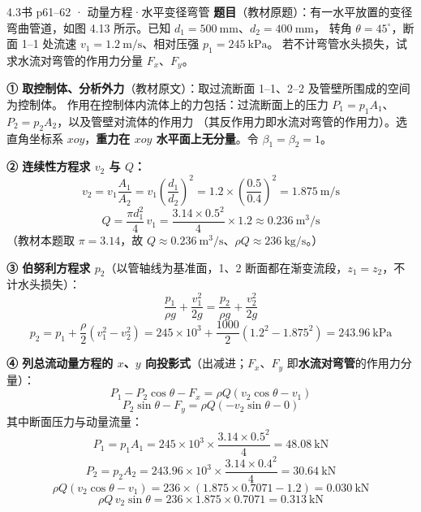 \begin{liti}{4.3}{书 p61--62 · 动量方程·水平变径弯管}
\textbf{题目}（教材原题）：有一水平放置的变径弯曲管道，如图 4.13 所示。已知 $d_1=500\ \mathrm{mm}$、$d_2=400\ \mathrm{mm}$，
转角 $\theta=45^{\circ}$，断面 1--1 处流速 $v_1=1.2\ \mathrm{m/s}$、相对压强 $p_1=245\ \mathrm{kPa}$。
若不计弯管水头损失，试求水流对弯管的作用力分量 $F_x$、$F_y$。


\begin{jie}
\textbf{① 取控制体、分析外力}（教材原文）：取过流断面 1--1、2--2 及管壁所围成的空间为控制体。
作用在控制体内流体上的力包括：过流断面上的压力 $P_1=p_1A_1$、$P_2=p_2A_2$，以及管壁对流体的作用力
（其反作用力即水流对弯管的作用力）。选直角坐标系 $xoy$，\textbf{重力在 $xoy$ 水平面上无分量}。令 $\beta_1=\beta_2=1$。

\textbf{② 连续性方程求 $v_2$ 与 $Q$：}
\[ v_2=v_1\frac{A_1}{A_2}=v_1\left(\frac{d_1}{d_2}\right)^2=1.2\times\left(\frac{0.5}{0.4}\right)^2=1.875\ \mathrm{m/s} \]
\[ Q=\frac{\pi d_1^2}{4}\,v_1=\frac{3.14\times0.5^2}{4}\times1.2\approx0.236\ \mathrm{m^3/s} \]
（教材本题取 $\pi=3.14$，故 $Q\approx0.236\ \mathrm{m^3/s}$、$\rho Q\approx236\ \mathrm{kg/s}$。）

\textbf{③ 伯努利方程求 $p_2$}（以管轴线为基准面，1、2 断面都在渐变流段，$z_1=z_2$，不计水头损失）：
\[ \frac{p_1}{\rho g}+\frac{v_1^2}{2g}=\frac{p_2}{\rho g}+\frac{v_2^2}{2g} \]
\[ p_2=p_1+\frac{\rho}{2}\left(v_1^2-v_2^2\right)=245\times10^3+\frac{1000}{2}\left(1.2^2-1.875^2\right)=243.96\ \mathrm{kPa} \]

\textbf{④ 列总流动量方程的 $x$、$y$ 向投影式}（出减进；$F_x$、$F_y$ 即\textbf{水流对弯管}的作用力分量）：
\[ P_1-P_2\cos\theta-F_x=\rho Q\left(v_2\cos\theta-v_1\right) \]
\[ P_2\sin\theta-F_y=\rho Q\left(-v_2\sin\theta-0\right) \]
其中断面压力与动量流量：
\[ P_1=p_1A_1=245\times10^3\times\frac{3.14\times0.5^2}{4}=48.08\ \mathrm{kN} \]
\[ P_2=p_2A_2=243.96\times10^3\times\frac{3.14\times0.4^2}{4}=30.64\ \mathrm{kN} \]
\[ \rho Q\left(v_2\cos\theta-v_1\right)=236\times\left(1.875\times0.7071-1.2\right)=0.030\ \mathrm{kN} \]
\[ \rho Q\,v_2\sin\theta=236\times1.875\times0.7071=0.313\ \mathrm{kN} \]


\end{jie}
\end{liti}
